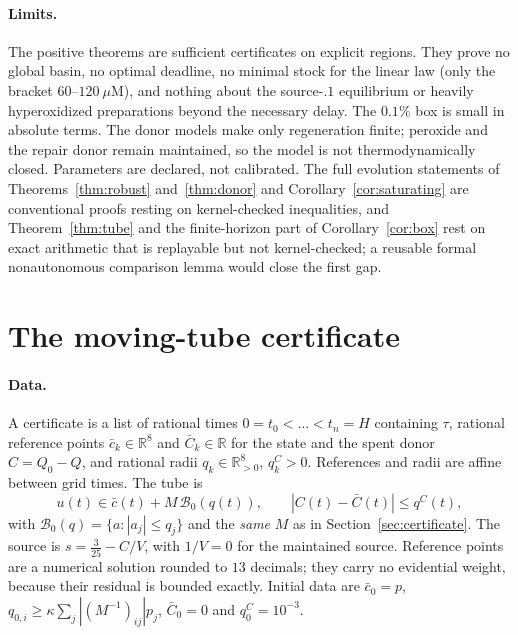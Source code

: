 \documentclass[11pt,a4paper]{article}
\theoremstyle{plain}
\theoremstyle{definition}
\theoremstyle{remark}
\newcommand{\R}{\mathbb R}
\newcommand{\uM}{\ensuremath{\mu\mathrm{M}}}
\begin{document}
\paragraph{Limits.}
The positive theorems are sufficient certificates on explicit regions. They
prove no global basin, no optimal deadline, no minimal stock for the linear
law (only the bracket $60$--$120~\uM$), and nothing about the source-$.1$
equilibrium or heavily hyperoxidized preparations beyond the necessary delay.
The $0.1\%$ box is small in absolute terms. The donor models make only
regeneration finite; peroxide and the repair donor remain maintained, so the
model is not thermodynamically closed. Parameters are declared, not
calibrated. The full evolution statements of Theorems~\ref{thm:robust}
and~\ref{thm:donor} and Corollary~\ref{cor:saturating} are conventional proofs
resting on kernel-checked inequalities, and Theorem~\ref{thm:tube} and the
finite-horizon part of Corollary~\ref{cor:box} rest on exact arithmetic that is
replayable but not kernel-checked; a reusable formal nonautonomous comparison
lemma would close the first gap.

\appendix
\section{The moving-tube certificate}\label{sec:tube}

\paragraph{Data.}
A certificate is a list of rational times $0=t_0<\dots<t_n=H$ containing
$\tau$, rational reference points $\bar c_k\in\R^8$ and $\bar C_k\in\R$ for the
state and the spent donor $C=Q_0-Q$, and rational radii $q_k\in\R^8_{>0}$,
$q^C_k>0$. References and radii are affine between grid times. The tube is
\[
u(t)\in\bar c(t)+M\,\mathcal B_0(q(t)),\qquad |C(t)-\bar C(t)|\le q^C(t),
\]
with $\mathcal B_0(q)=\{a:|a_j|\le q_j\}$ and the \emph{same} $M$ as in
Section~\ref{sec:certificate}. The source is $s=\tfrac3{25}-C/V$, with
$1/V=0$ for the maintained source. Reference points are a numerical solution
rounded to $13$ decimals; they carry no evidential weight, because their
residual is bounded exactly. Initial data are $\bar c_0=p$,
$q_{0,i}\ge\kappa\sum_j|(M^{-1})_{ij}|p_j$, $\bar C_0=0$ and $q^C_0=10^{-3}$.
\end{document}
